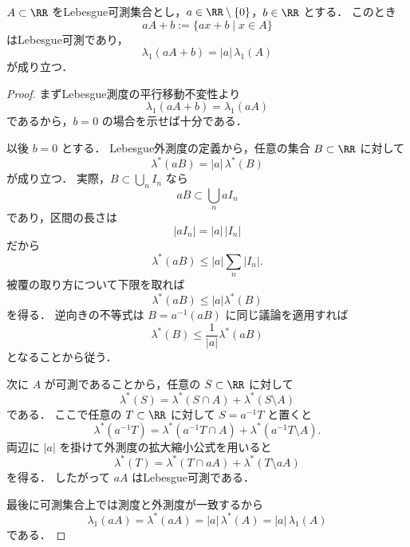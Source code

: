 \begin{proposition}\label{prop:one-dimensional-affine-set-transform}
$A\subset\RR$ をLebesgue可測集合とし，$a\in\RR\setminus\{0\}$，$b\in\RR$ とする．
このとき
\[
aA+b:=\{ax+b\mid x\in A\}
\]
はLebesgue可測であり，
\[
\lambda_1(aA+b)=|a|\,\lambda_1(A)
\]
が成り立つ．
\end{proposition}
\begin{proof}
まずLebesgue測度の平行移動不変性より
\[
\lambda_1(aA+b)=\lambda_1(aA)
\]
であるから，$b=0$ の場合を示せば十分である．

以後 $b=0$ とする．
Lebesgue外測度の定義から，任意の集合 $B\subset\RR$ に対して
\[
\lambda^*(aB)=|a|\,\lambda^*(B)
\]
が成り立つ．
実際，$B\subset\bigcup_n I_n$ なら
\[
aB\subset\bigcup_n aI_n
\]
であり，区間の長さは
\[
|aI_n|=|a|\,|I_n|
\]
だから
\[
\lambda^*(aB)\le |a|\sum_n |I_n|.
\]
被覆の取り方について下限を取れば
\[
\lambda^*(aB)\le |a|\lambda^*(B)
\]
を得る．
逆向きの不等式は $B=a^{-1}(aB)$ に同じ議論を適用すれば
\[
\lambda^*(B)\le \frac1{|a|}\lambda^*(aB)
\]
となることから従う．

次に $A$ が可測であることから，任意の $S\subset\RR$ に対して
\[
\lambda^*(S)=\lambda^*(S\cap A)+\lambda^*(S\setminus A)
\]
である．
ここで任意の $T\subset\RR$ に対して $S=a^{-1}T$ と置くと
\[
\lambda^*(a^{-1}T)
=
\lambda^*(a^{-1}T\cap A)+\lambda^*(a^{-1}T\setminus A).
\]
両辺に $|a|$ を掛けて外測度の拡大縮小公式を用いると
\[
\lambda^*(T)
=
\lambda^*(T\cap aA)+\lambda^*(T\setminus aA)
\]
を得る．
したがって $aA$ はLebesgue可測である．

最後に可測集合上では測度と外測度が一致するから
\[
\lambda_1(aA)=\lambda^*(aA)=|a|\,\lambda^*(A)=|a|\,\lambda_1(A)
\]
である．
\end{proof}

